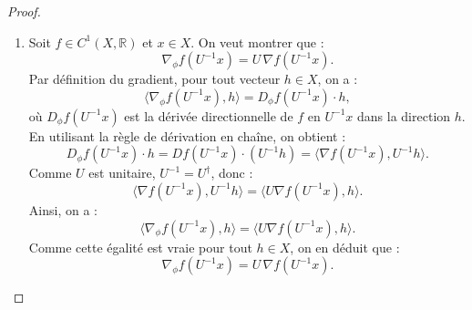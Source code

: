 \documentclass[a4paper,10pt]{article}
\theoremstyle{definition} %
\theoremstyle{definition} %
\theoremstyle{definition} %
\theoremstyle{definition} %
\newcommand{\R}{\mathbb{R}}
\begin{document}
\begin{proof}
\begin{enumerate}[label=(\roman*)]
        \item Soit \( f \in C^1(X, \R) \) et \( x \in X \). On veut montrer que :
        \[
        \nabla_\phi f(U^{-1}x) = U \, \nabla f(U^{-1}x).
        \]
        Par définition du gradient, pour tout vecteur \( h \in X \), on a :
        \[
        \langle \nabla_\phi f(U^{-1}x), h \rangle = D_\phi f(U^{-1}x) \cdot h,
        \]
        où \( D_\phi f(U^{-1}x) \) est la dérivée directionnelle de \( f \) en \( U^{-1}x \) dans la direction \( h \). En utilisant la règle de dérivation en chaîne, on obtient :
        \[
        D_\phi f(U^{-1}x) \cdot h = D f(U^{-1}x) \cdot (U^{-1} h) = \langle \nabla f(U^{-1}x), U^{-1} h \rangle.
        \]
        Comme \( U \) est unitaire, \( U^{-1} = U^\dagger \), donc :
        \[
        \langle \nabla f(U^{-1}x), U^{-1} h \rangle = \langle U \nabla f(U^{-1}x), h \rangle.
        \]
        Ainsi, on a :
        \[
        \langle \nabla_\phi f(U^{-1}x), h \rangle = \langle U \nabla f(U^{-1}x), h \rangle.
        \]
        Comme cette égalité est vraie pour tout \( h \in X \), on en déduit que :
        \[
        \nabla_\phi f(U^{-1}x) = U \, \nabla f(U^{-1}x).
        \]
    \end{enumerate}
\end{proof}



\end{document}
